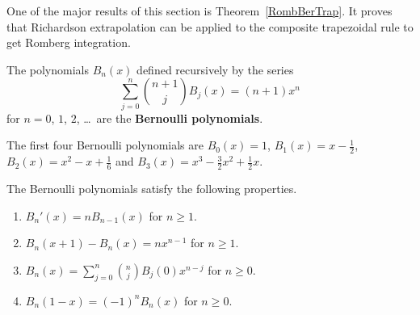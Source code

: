 One of the major results of this section is Theorem~\ref{RombBerTrap}.  It
proves that Richardson extrapolation can be applied to the composite
trapezoidal rule to get Romberg integration.

\begin{defn}
The polynomials $B_n(x)$ defined recursively by the series
\begin{equation} \label{BePo}
\sum_{j=0}^n \binom{n+1}{j} B_j(x) = (n+1)x^n
\end{equation}
for $n=0$, $1$, $2$, \ldots\ are the
{\bfseries Bernoulli polynomials}.
\end{defn}

\begin{rmk}
The first four Bernoulli polynomials are $B_0(x) = 1$,
$\displaystyle B_1(x) = x - \frac{1}{2}$,
$\displaystyle B_2(x) = x^2 - x + \frac{1}{6}$ and
$\displaystyle B_3(x) = x^3 - \frac{3}{2}x^2 + \frac{1}{2}x$.
\end{rmk}

\begin{prop}
The Bernoulli polynomials satisfy the following properties.
\begin{enumerate}
\item $B_n'(x) = n B_{n-1}(x)$ for $n\geq 1$.
\item $B_n(x+1) - B_n(x) = n x^{n-1}$ for $n\geq 1$.
\item $\displaystyle B_n(x) = \sum_{j=0}^n \binom{n}{j} B_j(0) x^{n-j}$
for $n \geq 0$.
\item $B_n(1-x) = (-1)^n B_n(x)$ for $n \geq 0$.
\end{enumerate}
\label{BePoProp}
\end{prop}

